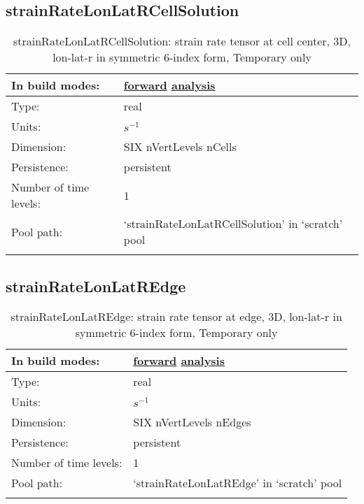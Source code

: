 \subsection[strainRateLonLatRCellSolution]{strainRateLonLatRCellSolution}
\label{subsec:var_sec_scratch_strainRateLonLatRCellSolution}
\begin{center}
\begin{longtable}{| p{2.0in} | p{4.0in} |}
        \hline 
        In build modes: & \hyperref[subsec:forward_var_tab_scratch]{forward} \hyperref[subsec:analysis_var_tab_scratch]{analysis} \\
        \hline 
        Type: & real \\
        \hline 
        Units: & $s^{-1}$ \\
        \hline 
        Dimension: & SIX nVertLevels nCells \\
        \hline 
        Persistence: & persistent \\
        \hline 
        Number of time levels: & 1 \\
        \hline 
            Pool path: & `strainRateLonLatRCellSolution' in `scratch' pool \\
		 \hline 
    \caption{strainRateLonLatRCellSolution: strain rate tensor at cell center, 3D, lon-lat-r in symmetric 6-index form, {\color{red}Temporary only}}
\end{longtable}
\end{center}
\subsection[strainRateLonLatREdge]{strainRateLonLatREdge}
\label{subsec:var_sec_scratch_strainRateLonLatREdge}
\begin{center}
\begin{longtable}{| p{2.0in} | p{4.0in} |}
        \hline 
        In build modes: & \hyperref[subsec:forward_var_tab_scratch]{forward} \hyperref[subsec:analysis_var_tab_scratch]{analysis} \\
        \hline 
        Type: & real \\
        \hline 
        Units: & $s^{-1}$ \\
        \hline 
        Dimension: & SIX nVertLevels nEdges \\
        \hline 
        Persistence: & persistent \\
        \hline 
        Number of time levels: & 1 \\
        \hline 
            Pool path: & `strainRateLonLatREdge' in `scratch' pool \\
		 \hline 
    \caption{strainRateLonLatREdge: strain rate tensor at edge, 3D, lon-lat-r in symmetric 6-index form, {\color{red}Temporary only}}
\end{longtable}
\end{center}
